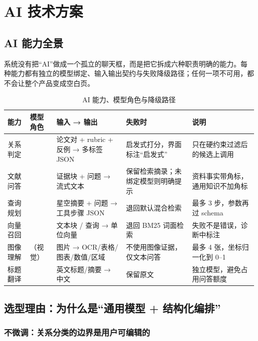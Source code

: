 \section{AI 技术方案}

\subsection{AI 能力全景}

系统没有把“AI”做成一个孤立的聊天框，而是把它拆成六种职责明确的能力。每种能力都有独立的模型绑定、输入输出契约与失败降级路径；任何一项不可用，都不会让整个产品变成空白页。

\begin{table}[htbp]
  \centering
  \small
  \caption{AI 能力、模型角色与降级路径}
  \label{tab:ai-map}
  \begin{tabularx}{\textwidth}{L{2.3cm}L{2.1cm}L{4.3cm}L{2.7cm}Y}
    \toprule
\textbf{能力} & \textbf{模型角色} & \textbf{输入 → 输出} & \textbf{失败时} & \textbf{说明} \\
    \midrule
    关系判定 &  & 论文对 + rubric + 反例 → 多标签 JSON & 启发式打分，界面标注“启发式” & 只在硬约束过滤后的候选上调用 \\
    文献问答 &  & 证据块 + 问题 → 流式文本 & 保留检索摘录；未绑定模型则明确提示 & 资料事实带角标，通用知识不加角标 \\
    查询规划 &  & 星空摘要 + 问题 → 工具步骤 JSON & 退回默认混合检索 & 最多 3 步，参数再过 schema \\
    向量召回 &  & 文本块 / 查询 → 单位向量 & 退回 BM25 词面检索 & 失败不是错误，诊断中标注  \\
    图像理解 & （视觉） & 图片 → OCR/表格/图表/数值/区域 & 不使用图像证据，仅文本问答 & 最多 4 张，坐标归一化到 0--1 \\
    标题翻译 &  & 英文标题/摘要 → 中文 & 保留原文 & 独立模型，避免占用问答额度 \\
    \bottomrule
  \end{tabularx}
\end{table}

\subsection{选型理由：为什么是“通用模型 + 结构化编排”}

\subsubsection{不微调：关系分类的边界是用户可编辑的}

